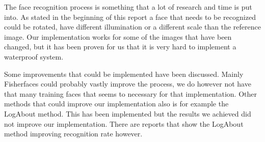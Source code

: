 The face recognition process is something that a lot of research and time is put into. As stated in the beginning of this report a face that needs to be recognized could be rotated, have different illumination or a different scale than the reference image. Our implementation works for some of the images that have been changed, but it has been proven for us that it is very hard to implement a waterproof system.

Some improvements that could be implemented have been discussed. Mainly Fisherfaces could probably vastly improve the process, we do however not have that many training faces that seems to necessary for that implementation. Other methods that could improve our implementation also is for example the LogAbout method. This has been implemented but the results we achieved did not improve our implementation. There are reports that show the LogAbout method improving recognition rate however.
